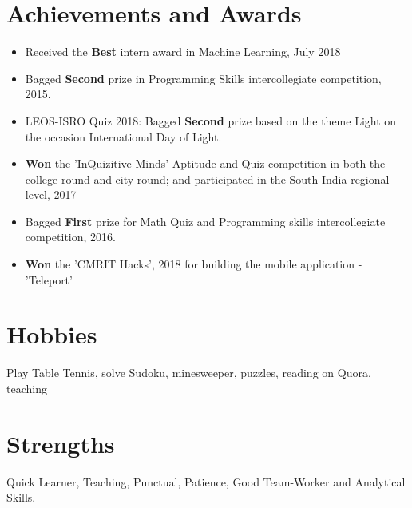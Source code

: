 \documentclass[margin, centered]{res}
\begin{document}
\begin{resume}

\section{Achievements and Awards}
\begin{itemize}[leftmargin=*]
 \item Received the \textbf{Best} intern award in Machine Learning, July 2018
 \item Bagged \textbf{Second} prize in Programming Skills intercollegiate competition, 2015.
 \item LEOS-ISRO Quiz 2018: Bagged \textbf{Second} prize based on the theme Light on the occasion International
Day of Light.
 \item \textbf{Won} the ’InQuizitive Minds’ Aptitude and Quiz competition in both the college round and city round;
and participated in the South India regional level, 2017
 \item Bagged \textbf{First} prize for Math Quiz and Programming skills intercollegiate competition, 2016.
 \item \textbf{Won} the ’CMRIT Hacks’, 2018 for building the mobile application - ’Teleport’
\end{itemize}


\section{Hobbies}
Play Table Tennis, solve Sudoku, minesweeper, puzzles, reading on Quora, teaching

\section{Strengths}
Quick Learner, Teaching, Punctual, Patience, Good Team-Worker and Analytical Skills.

\end{resume}
\end{document}
